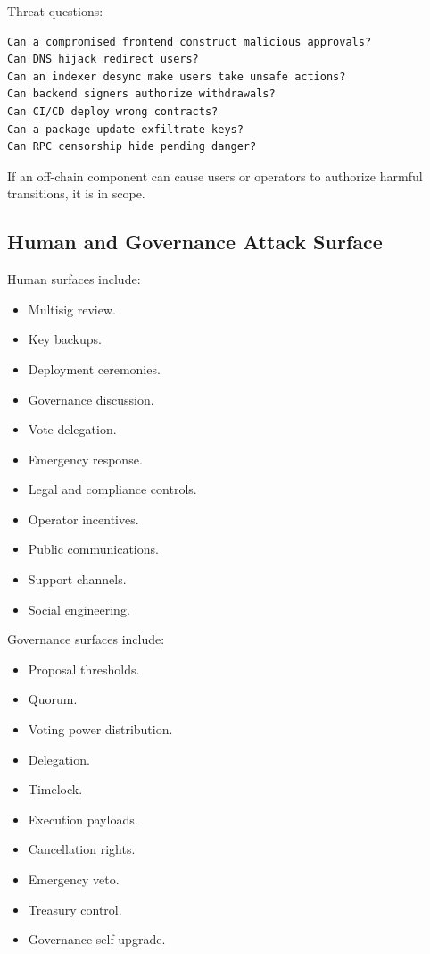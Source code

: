 Threat questions:

\begin{lstlisting}
Can a compromised frontend construct malicious approvals?
Can DNS hijack redirect users?
Can an indexer desync make users take unsafe actions?
Can backend signers authorize withdrawals?
Can CI/CD deploy wrong contracts?
Can a package update exfiltrate keys?
Can RPC censorship hide pending danger?
\end{lstlisting}

If an off-chain component can cause users or operators to authorize
harmful transitions, it is in scope.

\subsection{Human and Governance Attack Surface}

Human surfaces include:

\begin{itemize}
\tightlist
\item
  Multisig review.
\item
  Key backups.
\item
  Deployment ceremonies.
\item
  Governance discussion.
\item
  Vote delegation.
\item
  Emergency response.
\item
  Legal and compliance controls.
\item
  Operator incentives.
\item
  Public communications.
\item
  Support channels.
\item
  Social engineering.
\end{itemize}

Governance surfaces include:

\begin{itemize}
\tightlist
\item
  Proposal thresholds.
\item
  Quorum.
\item
  Voting power distribution.
\item
  Delegation.
\item
  Timelock.
\item
  Execution payloads.
\item
  Cancellation rights.
\item
  Emergency veto.
\item
  Treasury control.
\item
  Governance self-upgrade.
\end{itemize}

